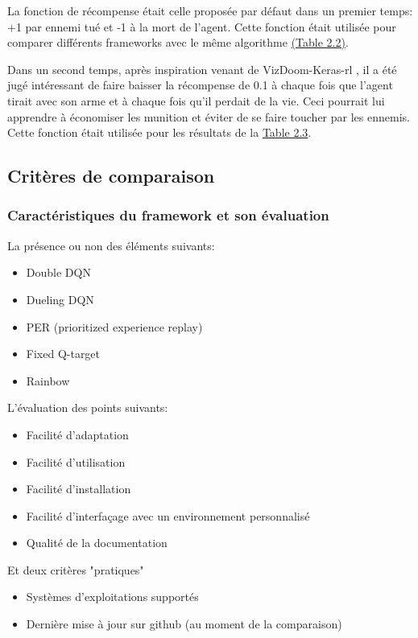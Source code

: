 \documentclass[a4paper,10pt,openany,oneside]{report}
\begin{document}
La fonction de récompense était celle proposée par défaut dans un premier temps: +1 par ennemi tué et -1 à la mort de l'agent. Cette fonction était utilisée pour comparer différents frameworks avec le même algorithme \hyperref[sec:table22]{(Table 2.2)}.

Dans un second temps, après inspiration venant de VizDoom-Keras-rl \cite[]{vizDoomkeras-rl}, il a été jugé intéressant de faire baisser la récompense de 0.1 à chaque fois que l'agent tirait avec son arme et à chaque fois qu'il perdait de la vie. Ceci pourrait lui apprendre à économiser les munition et éviter de se faire toucher par les ennemis. Cette fonction était utilisée pour les résultats de la \hyperref[sec:table23]{Table 2.3}.
\subsection{Critères de comparaison}
\subsubsection*{Caractéristiques du framework et son évaluation}
La présence ou non des éléments suivants:
\begin{itemize}
	\item Double DQN
	\item Dueling DQN
	\item PER (prioritized experience replay)
	\item Fixed Q-target
	\item Rainbow
\end{itemize}
L'évaluation des points suivants:
\begin{itemize}
	\item Facilité d'adaptation
	\item Facilité d'utilisation
	\item Facilité d'installation
	\item Facilité d'interfaçage avec un environnement personnalisé
	\item Qualité de la documentation
\end{itemize}

Et deux critères "pratiques"
\begin{itemize}
	\item Systèmes d'exploitations supportés
	\item Dernière mise à jour sur github (au moment de la comparaison)
\end{itemize}
\end{document}
